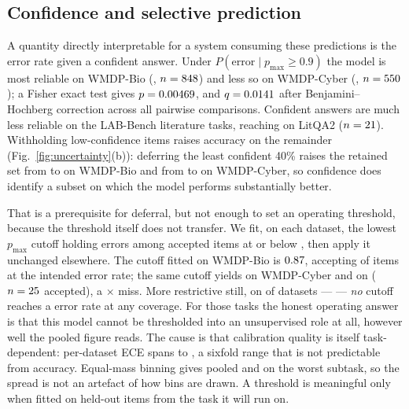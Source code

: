 \documentclass[conference]{IEEEtran}
\newcommand{\pmax}{p_{\max}}
\begin{document}
\subsection{Confidence and selective prediction}
\label{sec:selective}

A quantity directly interpretable for a system consuming these predictions is the error
rate given a confident answer. Under $P(\text{error} \mid \pmax \geq 0.9)$ the model is
most reliable on WMDP-Bio (\statErrGivenHiBio{}, $n=848{}$) and less so on
WMDP-Cyber (\statErrGivenHiCyber{}, $n=550{}$); a Fisher exact test gives $p =
0.00469{}$, and $q = 0.0141{}$ after Benjamini--Hochberg
correction across all pairwise comparisons. Confident answers are much less reliable on the
LAB-Bench literature tasks, reaching \statErrGivenHiLitQA{} on LitQA2 ($n=21{}$).
Withholding low-confidence items raises accuracy on the remainder
(Fig.~\ref{fig:uncertainty}(b)): deferring the least confident 40\% raises the retained set
from \statAccBio{} to \statRCBioAtSixtyPct{} on WMDP-Bio and from \statAccCyber{} to
\statRCCyberAtSixtyPct{} on WMDP-Cyber, so confidence does identify a subset on which the
model performs substantially better.

That is a prerequisite for deferral, but not enough to set an operating threshold, because
the threshold itself does not transfer. We fit, on each dataset, the lowest $\pmax$ cutoff
holding errors among accepted items at or below \statThrTarget{}, then apply it unchanged
elsewhere. The cutoff fitted on WMDP-Bio is $0.87{}$, accepting
\statThrCovBio{} of items at the intended \statThrBioOnBio{} error rate; the same cutoff
yields \statThrBioOnCyber{} on WMDP-Cyber and \statThrBioWorst{} on
\statThrBioWorstLabel{} ($n = 25{}$ accepted), a
\statThrBioWorstRatio{}$\times$ miss. More restrictive still, on \statThrNUnachievable{} of
\statThrNDatasets{} datasets --- \statThrUnachievableList{} --- \emph{no} cutoff reaches a
\statThrTarget{} error rate at any coverage. For those tasks the honest operating answer is
that this model cannot be thresholded into an unsupervised role at all, however well the
pooled figure reads. The cause is that calibration quality is itself task-dependent:
per-dataset ECE spans \statEceSpreadMin{} to \statEceSpreadMax{}, a sixfold range that is
not predictable from accuracy. Equal-mass binning gives \statEceAdaptivePooled{} pooled and
\statEceAdaptiveSupp{} on the worst subtask, so the spread is not an artefact of how bins
are drawn. A threshold is meaningful only when fitted on held-out items from the task it
will run on.
\end{document}
